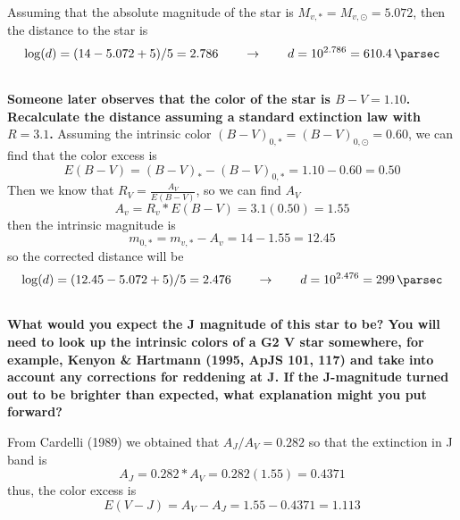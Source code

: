 Assuming that the absolute magnitude of the star is $M_{v,*} = M_{v,\odot}=5.072$, then the distance to the star is
\begin{equation}
    \log(d) = (14-5.072+5)/5 = 2.786 \qquad\rightarrow\qquad d = 10^{2.786}= \SI{610.4}{\parsec}
\end{equation}


\subsection{}
\textbf{Someone later observes that the color of the star is $B-V = 1.10$. 
Recalculate the distance assuming a standard extinction law with $R = 3.1$.}
Assuming the intrinsic color $(B-V)_{0,*} = (B-V)_{0,\odot}=0.60$, we can find that the color excess is
\begin{equation*}
    E(B-V) = (B-V)_* - (B-V)_{0,*} = 1.10 - 0.60 = 0.50
\end{equation*}
Then we know that $R_V = \frac{A_V}{E(B-V)}$, so we can find $A_V$
\begin{equation*}
    A_v = R_v*E(B-V) = 3.1(0.50) = 1.55
\end{equation*}
then the intrinsic magnitude is
\begin{equation*}
    m_{0,*} = m_{v,*} - A_v = 14 - 1.55 = 12.45
\end{equation*}
so the corrected distance will be
\begin{equation}
    \log(d) = (12.45-5.072+5)/5 = 2.476 \qquad\rightarrow\qquad d = 10^{2.476}= \SI{299}{\parsec}
\end{equation}


\subsection{}
\textbf{What would you expect the J magnitude of this star to be?
You will need to look up the intrinsic colors of a G2 V star somewhere, for example, Kenyon \& Hartmann (1995, ApJS 101, 117) and take into account any corrections for reddening at J.
If the J-magnitude turned out to be brighter than expected, what explanation might you put forward?}

From Cardelli (1989) we obtained that $A_J / A_V = 0.282$ so that the extinction in J band is 
\begin{equation}
    A_J = 0.282*A_V = 0.282(1.55) = 0.4371
\end{equation}
thus, the color excess is 
\begin{equation*}
    E(V-J) = A_V - A_J = 1.55 - 0.4371 = 1.113
\end{equation*}

